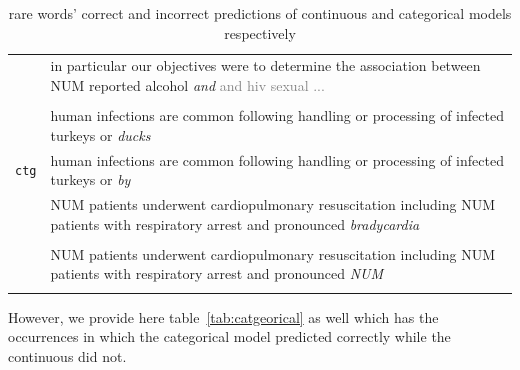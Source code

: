 \documentclass[11pt,a4paper]{article}
\begin{document}
\begin{table}[t]
\begin{tabularx}{\linewidth}{ll}
    \addlinespace[1ex] 
    {\tt ctg} & \multirow{1}{*}{\parbox{13cm}{in particular our objectives were to determine the association between NUM reported alcohol \textit{and} \textcolor{gray}{and hiv sexual ...}}} \\ \\ 
    \addlinespace[1ex] 
   {\tt G} & human infections are common following handling or processing of infected turkeys or \textit{ducks} \\
    {\tt ctg} & human infections are common following handling or processing of infected turkeys or \textit{by} \\
    \addlinespace[1ex] 
   {\tt G} & \multirow{1}{*}{\parbox{13cm}{NUM patients underwent cardiopulmonary resuscitation including NUM patients with respiratory arrest and pronounced \textit{bradycardia}}} \\ \\
    \addlinespace[1ex] 
   {\tt ctg} & \multirow{1}{*}{\parbox{13cm}{NUM patients underwent cardiopulmonary resuscitation including NUM patients with respiratory arrest and pronounced \textit{NUM}}} \\ \\
\end{tabularx}
  \caption{rare words' correct and incorrect predictions of continuous and categorical models respectively }
  \label{tab:rare}
\end{table}

However, we provide here table~\ref{tab:catgeorical} as well which has the occurrences in which the categorical model predicted correctly while the continuous did not.
\end{document}
